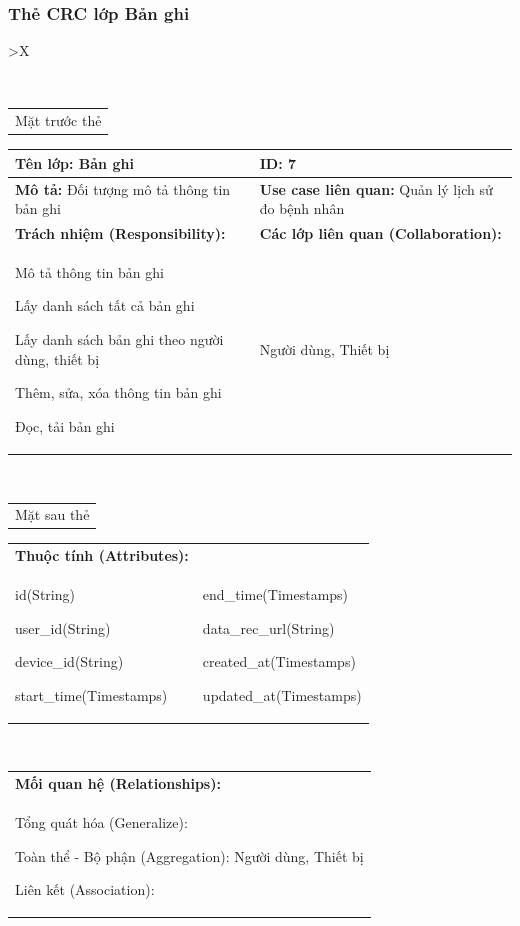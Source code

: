 \subsubsection{Thẻ CRC lớp Bản ghi}
  \begin{xltabular}{\textwidth}{
    >{\centering\arraybackslash}X 
  }
  \caption{\bfseries \fontsize{12pt}{0pt}\selectfont Thẻ CRC lớp Bản ghi}
  \\
  \begin{tabularx}{0.9\textwidth}{X}
    Mặt trước thẻ
  \end{tabularx}
  \begin{tabularx}{0.9\textwidth}{|X|X|}
    \hline
    \textbf{Tên lớp:} Bản ghi & \textbf{ID:} 7 \\
    \hline
    \textbf{Mô tả:} Đối tượng mô tả thông tin bản ghi & \textbf{Use case liên quan:} Quản lý lịch sử đo bệnh nhân \\
    \hline
    \textbf{Trách nhiệm (Responsibility):} & \textbf{Các lớp liên quan (Collaboration):} \\
    Mô tả thông tin bản ghi 

    Lấy danh sách tất cả bản ghi

    Lấy danh sách bản ghi theo người dùng, thiết bị

    Thêm, sửa, xóa thông tin bản ghi

    Đọc, tải bản ghi
    & 
    Người dùng, Thiết bị
    \\
    \hline
  \end{tabularx}
  \\ 
  \begin{tabularx}{0.9\textwidth}{X}
    Mặt sau thẻ
  \end{tabularx}
  \begin{tabularx}{0.9\textwidth}{|X|X|}
    \hline
    \textbf{Thuộc tính (Attributes):} & \\
    id(String) 
    
    user\_id(String)

    device\_id(String)

    start\_time(Timestamps)
    & 
    end\_time(Timestamps) 
    
    data\_rec\_url(String) 
    
    created\_at(Timestamps)

    updated\_at(Timestamps)
    \\
    \hline
  \end{tabularx}
  \\     
  \begin{tabularx}{0.9\textwidth}{|X|}
    \textbf{Mối quan hệ (Relationships):} \\
    Tổng quát hóa (Generalize):  

    Toàn thể - Bộ phận (Aggregation): Người dùng, Thiết bị
    
    Liên kết (Association):  
    \\
    \hline
  \end{tabularx}
  \end{xltabular}

